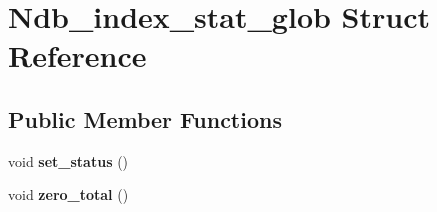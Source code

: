 \hypertarget{structNdb__index__stat__glob}{}\section{Ndb\+\_\+index\+\_\+stat\+\_\+glob Struct Reference}
\label{structNdb__index__stat__glob}
\subsection*{Public Member Functions}
\begin{DoxyCompactItemize}
\item 
\mbox{\label{structNdb__index__stat__glob_a18dfcf48bad1f613c2f6b5218e4bde33}} 
void {\bfseries set\+\_\+status} ()
\item 
\mbox{\label{structNdb__index__stat__glob_a7e31feba73ab16da202bee9a4bee8ba5}} 
void {\bfseries zero\+\_\+total} ()
\end{DoxyCompactItemize}
